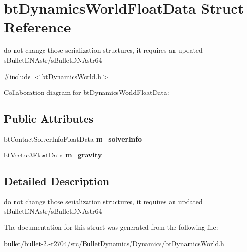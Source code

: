 \hypertarget{structbt_dynamics_world_float_data}{\section{bt\+Dynamics\+World\+Float\+Data Struct Reference}
\label{structbt_dynamics_world_float_data}
}


do not change those serialization structures, it requires an updated s\+Bullet\+D\+N\+Astr/s\+Bullet\+D\+N\+Astr64  




{\ttfamily \#include $<$bt\+Dynamics\+World.\+h$>$}



Collaboration diagram for bt\+Dynamics\+World\+Float\+Data\+:
\subsection*{Public Attributes}
\begin{DoxyCompactItemize}
\item 
\hypertarget{structbt_dynamics_world_float_data_aee3ebe6549fd707d03363c3a16dd6cc2}{\hyperlink{structbt_contact_solver_info_float_data}{bt\+Contact\+Solver\+Info\+Float\+Data} {\bfseries m\+\_\+solver\+Info}}\label{structbt_dynamics_world_float_data_aee3ebe6549fd707d03363c3a16dd6cc2}

\item 
\hypertarget{structbt_dynamics_world_float_data_ad3c05a12d9c1782940e0bbc053d2c8d7}{\hyperlink{structbt_vector3_float_data}{bt\+Vector3\+Float\+Data} {\bfseries m\+\_\+gravity}}\label{structbt_dynamics_world_float_data_ad3c05a12d9c1782940e0bbc053d2c8d7}

\end{DoxyCompactItemize}


\subsection{Detailed Description}
do not change those serialization structures, it requires an updated s\+Bullet\+D\+N\+Astr/s\+Bullet\+D\+N\+Astr64 

The documentation for this struct was generated from the following file\+:\begin{DoxyCompactItemize}
\item 
bullet/bullet-\/2.-\/r2704/src/\+Bullet\+Dynamics/\+Dynamics/bt\+Dynamics\+World.\+h\end{DoxyCompactItemize}
